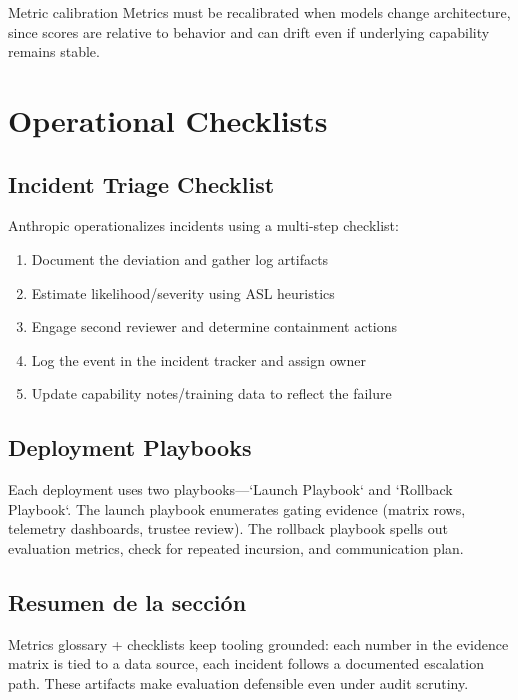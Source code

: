 \documentclass[a4paper]{article}
\begin{document}
\begin{warningbox}{Metric calibration}
Metrics must be recalibrated when models change architecture, since scores are relative to behavior and can drift even if underlying capability remains stable.
\end{warningbox}

\section{Operational Checklists}

\subsection{Incident Triage Checklist}

Anthropic operationalizes incidents using a multi-step checklist:

\begin{enumerate}
    \item Document the deviation and gather log artifacts
    \item Estimate likelihood/severity using ASL heuristics
    \item Engage second reviewer and determine containment actions
    \item Log the event in the incident tracker and assign owner
    \item Update capability notes/training data to reflect the failure
\end{enumerate}

\subsection{Deployment Playbooks}

Each deployment uses two playbooks—`Launch Playbook` and `Rollback Playbook`. The launch playbook enumerates gating evidence (matrix rows, telemetry dashboards, trustee review). The rollback playbook spells out evaluation metrics, check for repeated incursion, and communication plan.

\subsection{Resumen de la sección}

Metrics glossary + checklists keep tooling grounded: each number in the evidence matrix is tied to a data source, each incident follows a documented escalation path. These artifacts make evaluation defensible even under audit scrutiny.
\end{document}
